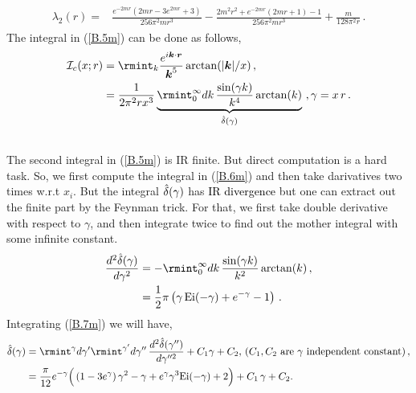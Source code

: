 \begin{align}
    \begin{split}
        \lambda_2(r)=&\frac{e^{-2m r} \left(2m r-3 e^{2m r}+3\right)}{256\pi^2 m r^3}-\frac{2m^2r^2+e^{-2mr}(2mr+1)-1}{256\pi^2m r^3}+\frac{m}{128\pi^2 r}\,.
    \end{split}
\end{align}
The integral in (\ref{B.5m}) can be done as follows,
\begin{align}
    \begin{split}
        \mathcal{I}_{c}(x;r)&=\rmint_{k}\frac{e^{i\boldsymbol{k}\cdot \boldsymbol{r}}}{\boldsymbol{k}^5}\arctan(|\boldsymbol{k}|/x)\,,\\ &
        =\frac{1}{2\pi^2 r x^3}\underbrace{\rmint_{0}^{\infty}dk \, \frac{\sin(\gamma k)}{k^4}\arctan(k)}_{\Hat{\delta}(\gamma)}\,\,,\gamma=x\,r\,.\\ &
    \end{split}\label{B.6m}
\end{align}
The second integral in (\ref{B.5m}) is IR finite. But direct computation is a hard task. So, we first compute the integral in (\ref{B.6m}) and then take darivatives two times w.r.t $x_i.$  But the integral $\Hat{\delta}(\gamma)$ has \textcolor{black}{IR divergence} but one can extract out the finite part by the Feynman trick. For that, we first take double derivative with respect to $\gamma$, and then integrate twice to find out the mother integral with some infinite constant.
\begin{align}
    \begin{split}
         \frac{d^2 \Hat{\delta}(\gamma)}{d\gamma^2}&=-\rmint_{0}^{\infty}dk \, \frac{\sin(\gamma k)}{k^2}\arctan(k)\,,\\ &
         =\frac{1}{2} \pi  \left(\gamma\,  \text{Ei}(-\gamma )+e^{-\gamma }-1\right)\,.
    \end{split}\label{B.7m}
\end{align}
Integrating (\ref{B.7m}) we will have,
\begin{align}
    \begin{split}
\Hat{\delta}(\gamma)&=\rmint^{\gamma}d\gamma'\rmint^{\gamma'}d\gamma''\,\frac{d^2 \Hat{\delta}(\gamma'')}{d\gamma''^2}+C_1 \gamma+C_{2},\,(\text{$C_1, C_2$ are $\gamma$ independent constant})\,,\\ &
        =\frac{\pi}{12}  e^{-\gamma } \Big(\left(1-3 e^{\gamma }\right) \gamma ^2-\gamma +e^{\gamma } \gamma ^3 \text{Ei}(-\gamma )+2\Big)+C_1\,\gamma+C_2.
    \end{split}\label{B.8m}
\end{align}

